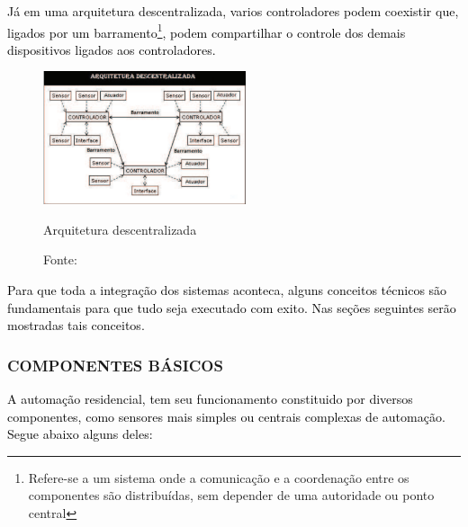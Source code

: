        \textcolor{black}{Já em uma arquitetura descentralizada, varios controladores podem coexistir que, ligados por um barramento\footnote{Refere-se a um sistema onde a comunicação e a coordenação entre os componentes são distribuídas, sem depender de uma autoridade ou ponto central}, podem compartilhar o controle dos demais dispositivos ligados aos controladores.}

        \begin{figure}[H]
                \centering
                \caption{ }  
                \centering
                \label{fig:cont}
                \includegraphics[width=0.53\textwidth]{imagens/arquiteturaDescentralizada.png}
                \caption*{Arquitetura descentralizada}
                \caption*{Fonte: \cite{hipolito2018automaccao}}
         \end{figure}

       \textcolor{black}{Para que toda a integração dos sistemas aconteca, alguns conceitos técnicos são fundamentais para que tudo seja executado com exito. Nas seções seguintes serão mostradas tais conceitos.}

       \subsubsection{COMPONENTES BÁSICOS}

        \textcolor{black}{A automação residencial, tem seu funcionamento constituido por diversos componentes, como sensores mais simples ou centrais complexas de automação. Segue abaixo alguns deles:}

